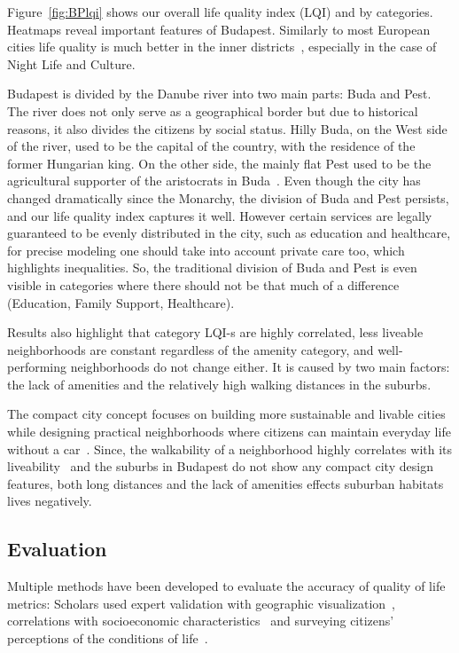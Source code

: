 Figure~\ref{fig:BPlqi} shows our overall life quality index (LQI) and by categories. Heatmaps reveal important features of Budapest. Similarly to most European cities life quality is much better in the inner districts~\cite{Hohenberg1996Urban,Brueckner1999Central}, especially in the case of Night Life and Culture.

Budapest is divided by the Danube river into two main parts: Buda and Pest. The river does not only serve as a geographical border but due to historical reasons, it also divides the citizens by social status. Hilly Buda, on the West side of the river, used to be the capital of the country, with the residence of the former Hungarian king. On the other side, the mainly flat Pest used to be the agricultural supporter of the aristocrats in Buda~\cite{Kover2006Magyarorszag}. Even though the city has changed dramatically since the Monarchy, the division of Buda and Pest persists, and our life quality index captures it well. However certain services are legally guaranteed to be evenly distributed in the city, such as education and healthcare, for precise modeling one should take into account private care too, which highlights inequalities. So, the traditional division of Buda and Pest is even visible in categories where there should not be that much of a difference (Education, Family Support, Healthcare).

Results also highlight that category LQI-s are highly correlated, less liveable neighborhoods are constant regardless of the amenity category, and well-performing neighborhoods do not change either. It is caused by two main factors: the lack of amenities and the relatively high walking distances in the suburbs.

The compact city concept focuses on building more sustainable and livable cities while designing practical neighborhoods where citizens can maintain everyday life without a car~\cite{Dittmar2012New}. Since, the walkability of a neighborhood highly correlates with its liveability~\cite{Rogers2011Examining} and the suburbs in Budapest do not show any compact city design features, both long distances and the lack of amenities effects suburban habitats lives negatively.

\subsection{Evaluation}

Multiple methods have been developed to evaluate the accuracy of quality of life metrics: Scholars used expert validation with geographic visualization~\cite{Rinner2007Geographic,Gavrilidis2016Urban}, correlations with socioeconomic characteristics~\cite{Talen2002Pedestrian} and surveying citizens’ perceptions of the conditions of life~\cite{Santos2007Monitoring}.


